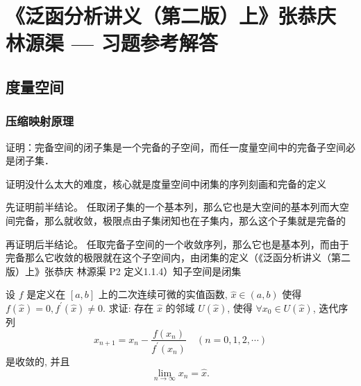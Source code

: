\chapter{《泛函分析讲义（第二版）上》张恭庆 林源渠 --- 习题参考解答}


\section{度量空间}


\subsection{压缩映射原理}

\begin{exercise}
  证明：完备空间的闭子集是一个完备的子空间，而任一度量空间中的完备子空间必是闭子集．
\end{exercise}

\begin{answer}
  \begin{analysis}
    证明没什么太大的难度，核心就是度量空间中闭集的序列刻画和完备的定义
  \end{analysis}
  \begin{step}
    \item 先证明前半结论。
      任取闭子集的一个基本列，那么它也是大空间的基本列而大空间完备，那么就收敛，极限点由子集闭知也在子集内，那么这个子集就是完备的
    \item 再证明后半结论。
      任取完备子空间的一个收敛序列，那么它也是基本列，而由于完备那么它收敛的极限就在这个子空间内，由闭集的定义（《泛函分析讲义（第二版）上》张恭庆 林源渠 P2 定义1.1.4）知子空间是闭集
  \end{step}
\end{answer}


\begin{exercise}[title = {Newton 法}]
  设 $f$ 是定义在 $[a, b]$ 上的二次连续可微的实值函数, $\hat{x} \in(a, b)$ 使得 $f(\hat{x})=0, f^{\prime}(\hat{x}) \neq 0$. 求证: 存在 $\hat{x}$ 的邻域 $U(\hat{x})$, 使得 $\forall x_{0} \in U(\hat{x})$, 迭代序列
  \[
    x_{n+1}=x_{n}-\frac{f(x_{n})}{f^{\prime}(x_{n})} \quad(n=0,1,2, \cdots)
  \]
  是收敛的, 并且
  \[
    \lim _{n \rightarrow \infty} x_{n}=\hat{x}.
  \]
\end{exercise}

